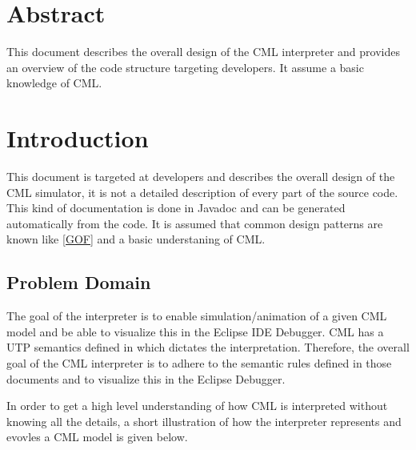 \documentclass[a4paper, 10pt]{include/compassreport}   %
\begin{document}
\maketitle


\section*{Abstract}
\label{sec:abstract}

This document describes the overall design of the CML
interpreter and provides an overview of the code structure
targeting developers. It assume a basic knowledge of CML.

\newpage

\tableofcontents
\newpage

\section{Introduction}\label{sec:introduction}
This document is targeted at developers and describes the overall
design of the CML simulator, it is not a detailed description of every
part of the source code. This kind of documentation is done in Javadoc
and can be generated automatically from the code. It is assumed that
common design patterns are known like \ref{GOF} and a basic
understaning of CML.

\subsection{Problem Domain}\label{sec:problem_domain}
The goal of the interpreter is to enable simulation/animation of a
given CML \cite{cml syntax} model and be able to visualize this in the
Eclipse IDE Debugger. CML has a UTP semantics defined in \cite{cml
semantics} which dictates the interpretation. Therefore, the
overall goal of the CML interpreter is to adhere to the semantic
rules defined in those documents and to visualize this in the
Eclipse Debugger.

In order to get a high level understanding of how CML is interpreted
without knowing all the details, a short illustration of how the interpreter
represents and evovles a CML model is given below.
\end{document}

